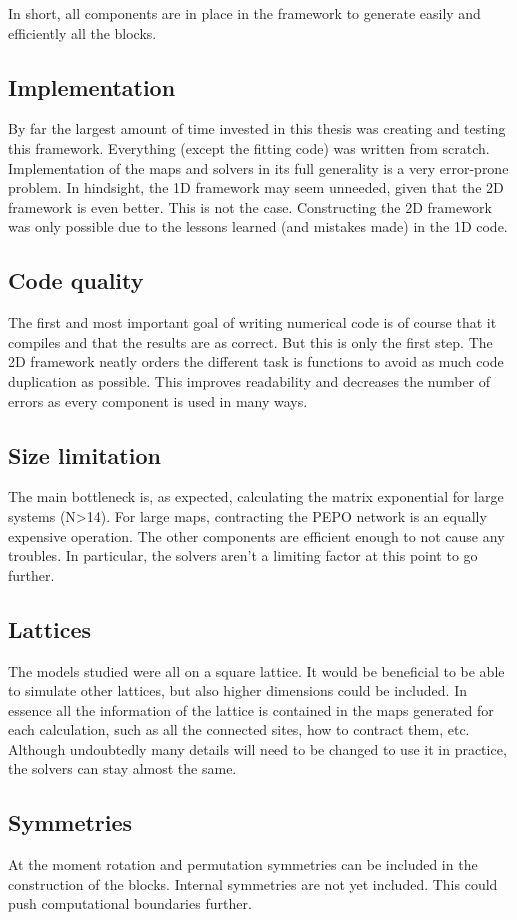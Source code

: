
In short, all components are in place in the framework to generate easily and efficiently all the blocks.

\subsection{Implementation}

By far the largest amount of time invested in this thesis was creating and testing this framework. Everything (except the fitting code) was written from scratch. Implementation of the maps and solvers in its full generality is a very error-prone problem. In hindsight, the 1D framework may seem unneeded, given that the 2D framework is even better. This is not the case. Constructing the 2D framework was only possible due to the lessons learned (and mistakes made) in the 1D code.

\subsection*{Code quality}
The first and most important goal of writing numerical code is of course that it compiles and that the results are as correct. But this is only the first step. The 2D framework neatly orders the different task is functions to avoid as much code duplication as possible. This improves readability and decreases the number of errors as every component is used in many ways.

\subsection*{Size limitation}
The main bottleneck is, as expected, calculating the matrix exponential for large systems (N>14). For large maps, contracting the PEPO network is an equally expensive operation. The other components are efficient enough to not cause any troubles. In particular, the solvers aren't a limiting factor at this point to go further.

\subsection*{Lattices}
The models studied were all on a square lattice. It would be beneficial to be able to simulate other lattices, but also higher dimensions could be included. In essence all the information of the lattice is contained in the maps generated for each calculation, such as all the connected sites, how to contract them, etc. Although undoubtedly many details will need to be changed to use it in practice, the solvers can stay almost the same.

\subsection*{Symmetries}

At the moment rotation and permutation symmetries can be included in the construction of the blocks. Internal symmetries are not yet included. This could push computational boundaries further.
